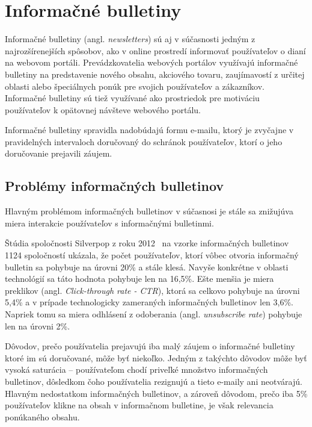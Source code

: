 
\newpage
\chapter{Informačné bulletiny}

Informačné bulletiny (angl. \emph{newsletters}) sú aj v súčasnosti jedným z najrozšírenejších spôsobov, ako v online
prostredí informovať používateľov o dianí na webovom portáli. Prevádzkovatelia webových portálov využívajú informačné
bulletiny na predstavenie nového obsahu, akciového tovaru, zaujímavostí z určitej oblasti alebo špeciálnych ponúk pre
svojich používateľov a zákazníkov. Informačné bulletiny sú tiež využívané ako prostriedok pre motiváciu používateľov
k opätovnej návšteve webového portálu.

Informačné bulletiny spravidla nadobúdajú formu e-mailu, ktorý je zvyčajne v pravidelných intervaloch doručovaný
do schránok používateľov, ktorí o jeho doručovanie prejavili záujem.


\section{Problémy informačných bulletinov}
Hlavným problémom informačných bulletinov v súčasnosi je stále sa znižujúva miera interakcie používateľov
s informačnými bulletinmi.

Štúdia spoločnosti Silverpop z roku 2012~\cite{mailmarketing} na vzorke informačných bulletinov 1124 spoločností ukázala,
že počet používateľov, ktorí vôbec otvoria informačný bulletin sa pohybuje na úrovni 20\% a stále klesá. Navyše konkrétne
v oblasti technológií sa táto hodnota pohybuje len na 16,5\%. Ešte menšia je miera preklikov
(angl. \emph{Click-through rate - CTR}), ktorá sa celkovo pohybuje na úrovni 5,4\% a v prípade technologicky zameraných
informačných bulletinov len 3,6\%. Napriek tomu sa miera odhlásení z odoberania (angl. \emph{unsubscribe rate}) pohybuje
len na úrovni 2\%.

Dôvodov, prečo používatelia prejavujú iba malý záujem o informačné bulletiny ktoré im sú doručované, môže byť niekoľko.
Jedným z takýchto dôvodov môže byť vysoká saturácia -- používateľom chodí priveľké množstvo informačných bulletinov,
dôsledkom čoho používatelia rezignujú a tieto e-maily ani neotvárajú.
Hlavným nedostatkom informačných bulletinov, a zároveň dôvodom, prečo iba 5\% používateľov klikne na obsah v informačnom
bulletine, je však relevancia ponúkaného obsahu.


